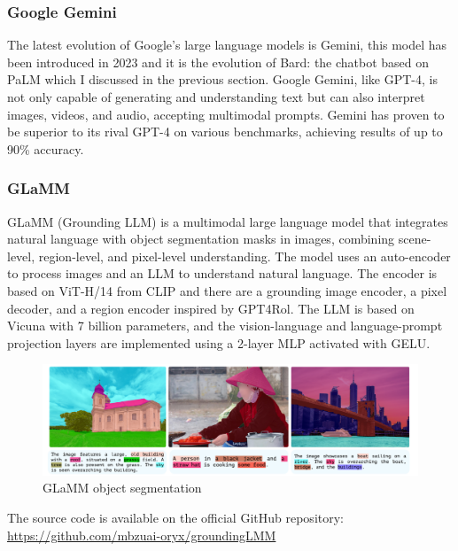 \subsubsection{Google Gemini}
The latest evolution of Google's large language models is Gemini, this model has been introduced in 2023 and it is the evolution of Bard: the chatbot based on PaLM which I discussed in the previous section. Google Gemini, like GPT-4, is not only capable of generating and understanding text but can also interpret images, videos, and audio, accepting multimodal prompts.\cite{gemini_introduction}
Gemini has proven to be superior to its rival GPT-4 on various benchmarks, achieving results of up to 90\% accuracy.
\subsubsection{GLaMM}
GLaMM (Grounding LLM) is a multimodal large language model that integrates natural language with object segmentation masks in images, combining scene-level, region-level, and pixel-level understanding. 
The model uses an auto-encoder to process images and an LLM to understand natural language. The encoder is based on ViT-H/14 from CLIP and there are a grounding image encoder, a pixel decoder, and a region encoder inspired by GPT4Rol. The LLM is based on Vicuna with 7 billion parameters, and the vision-language and language-prompt projection layers are implemented using a 2-layer MLP activated with GELU. \cite{rasheed2024glamm}
\begin{figure}[H]
    \centering
    \includegraphics[width=0.9\linewidth]{Figures/fig_23.png}
    \caption{GLaMM object segmentation}
    \label{fig:enter-label}
\end{figure}
The source code is available on the official GitHub repository:\\ \href{https://github.com/mbzuai-oryx/groundingLMM}{https://github.com/mbzuai-oryx/groundingLMM}

